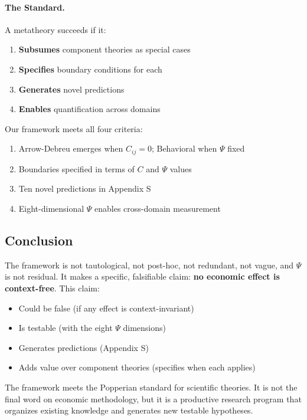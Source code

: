 \documentclass[12pt,a4paper]{article}
\begin{document}
\paragraph{The Standard.}
A metatheory succeeds if it:
\begin{enumerate}
    \item \textbf{Subsumes} component theories as special cases
    \item \textbf{Specifies} boundary conditions for each
    \item \textbf{Generates} novel predictions
    \item \textbf{Enables} quantification across domains
\end{enumerate}

Our framework meets all four criteria:
\begin{enumerate}
    \item Arrow-Debreu emerges when $C_{ij} = 0$; Behavioral when $\Psi$ fixed
    \item Boundaries specified in terms of $C$ and $\Psi$ values
    \item Ten novel predictions in Appendix S
    \item Eight-dimensional $\Psi$ enables cross-domain measurement
\end{enumerate}

\subsection{Conclusion}

The framework is not tautological, not post-hoc, not redundant, not vague, and $\Psi$ is not residual. It makes a specific, falsifiable claim: \textbf{no economic effect is context-free}. This claim:

\begin{itemize}
    \item Could be false (if any effect is context-invariant)
    \item Is testable (with the eight $\Psi$ dimensions)
    \item Generates predictions (Appendix S)
    \item Adds value over component theories (specifies when each applies)
\end{itemize}

The framework meets the Popperian standard for scientific theories. It is not the final word on economic methodology, but it is a productive research program that organizes existing knowledge and generates new testable hypotheses.
\end{document}
